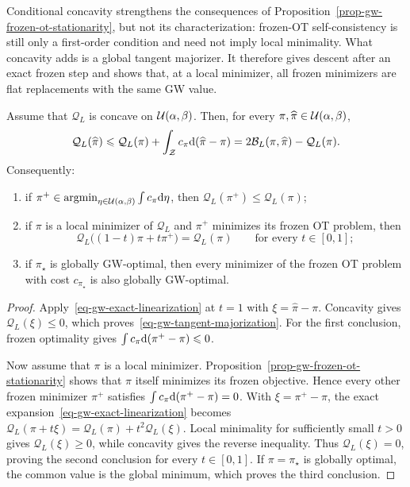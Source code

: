 Conditional concavity strengthens the consequences of Proposition~\ref{prop-gw-frozen-ot-stationarity}, but not its characterization: frozen-OT self-consistency is still only a first-order condition and need not imply local minimality. What concavity adds is a global tangent majorizer. It therefore gives descent after an exact frozen step and shows that, at a local minimizer, all frozen minimizers are flat replacements with the same GW value.

\begin{prop}\label{prop-gw-frozen-ot-replacement}
	Assume that $\mathcal Q_L$ is concave on $\mathcal{U}(\alpha,\beta)$. Then, for every $\pi,\widehat\pi\in\mathcal{U}(\alpha,\beta)$,
	\begin{equation}\label{eq-gw-tangent-majorization}
		\mathcal Q_L(\widehat\pi)
		\leqslant
		\mathcal Q_L(\pi)
		+
		\int_{\mathcal Z}c_\pi\mathrm{d}(\widehat\pi-\pi)
		=
		2\mathcal B_L(\pi,\widehat\pi)-\mathcal Q_L(\pi).
	\end{equation}
	Consequently:
	\begin{enumerate}
		\item if $\pi^+\in\operatorname{argmin}_{\eta\in\mathcal{U}(\alpha,\beta)}\int c_\pi\mathrm{d}\eta$, then $\mathcal Q_L(\pi^+)\leq\mathcal Q_L(\pi)$;
		\item if $\pi$ is a local minimizer of $\mathcal Q_L$ and $\pi^+$ minimizes its frozen OT problem, then
		\[
			\mathcal Q_L\bigl((1-t)\pi+t\pi^+\bigr)
			=
			\mathcal Q_L(\pi)
			\qquad\text{for every }t\in[0,1];
		\]
		\item if $\pi_\star$ is globally GW-optimal, then every minimizer of the frozen OT problem with cost $c_{\pi_\star}$ is also globally GW-optimal.
	\end{enumerate}
\end{prop}
\begin{proof}
	Apply~\eqref{eq-gw-exact-linearization} at $t=1$ with $\xi=\widehat\pi-\pi$. Concavity gives $\mathcal Q_L(\xi)\leq0$, which proves~\eqref{eq-gw-tangent-majorization}. For the first conclusion, frozen optimality gives $\int c_\pi\mathrm{d}(\pi^+-\pi)\leqslant0$.

	Now assume that $\pi$ is a local minimizer. Proposition~\ref{prop-gw-frozen-ot-stationarity} shows that $\pi$ itself minimizes its frozen objective. Hence every other frozen minimizer $\pi^+$ satisfies
	$\int c_\pi\mathrm{d}(\pi^+-\pi)=0$. With $\xi=\pi^+-\pi$, the exact expansion~\eqref{eq-gw-exact-linearization} becomes
	$\mathcal Q_L(\pi+t\xi) = \mathcal Q_L(\pi)+t^2\mathcal Q_L(\xi)$.
	Local minimality for sufficiently small $t>0$ gives $\mathcal Q_L(\xi)\geq0$, while concavity gives the reverse inequality. Thus $\mathcal Q_L(\xi)=0$, proving the second conclusion for every $t\in[0,1]$. If $\pi=\pi_\star$ is globally optimal, the common value is the global minimum, which proves the third conclusion.
\end{proof}


